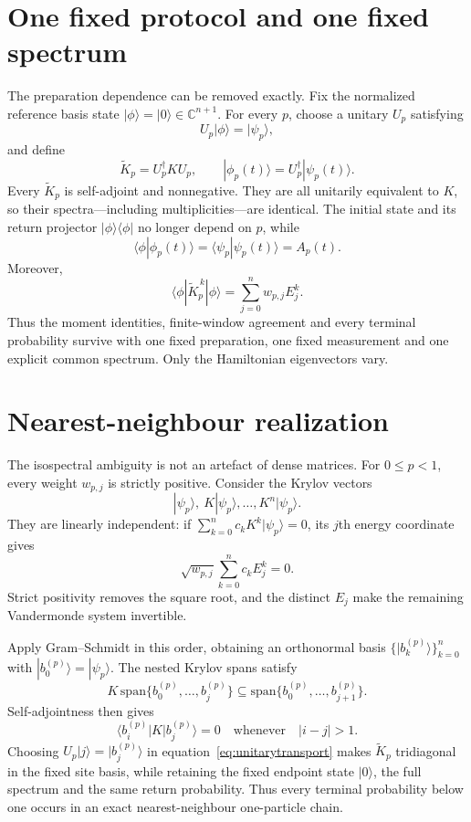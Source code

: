 \documentclass[12pt]{article}
\newcommand{\C}{\mathbb C}
\begin{document}
\section*{One fixed protocol and one fixed spectrum}

The preparation dependence can be removed exactly. Fix the normalized
reference basis state \(|\phi\rangle=|0\rangle\in\C^{n+1}\). For every \(p\), choose a
unitary \(U_p\) satisfying
\[
 U_p|\phi\rangle=|\psi_p\rangle,
\]
and define
\begin{equation}
 \widetilde K_p=U_p^\dagger K U_p,\qquad
 |\phi_p(t)\rangle=U_p^\dagger|\psi_p(t)\rangle .
\label{eq:unitarytransport}
\end{equation}
Every \(\widetilde K_p\) is self-adjoint and nonnegative. They are all
unitarily equivalent to \(K\), so their spectra---including
multiplicities---are identical. The initial state and its return projector
\(|\phi\rangle\langle\phi|\) no longer depend on \(p\), while
\begin{equation}
 \langle\phi|\phi_p(t)\rangle
 =\langle\psi_p|\psi_p(t)\rangle=A_p(t).
\label{eq:fixedprotocol}
\end{equation}
Moreover,
\[
 \langle\phi|\widetilde K_p^{\,k}|\phi\rangle
 =\sum_{j=0}^{n}w_{p,j}E_j^k.
\]
Thus the moment identities, finite-window agreement and every terminal
probability survive with one fixed preparation, one fixed measurement and
one explicit common spectrum. Only the Hamiltonian eigenvectors vary.

\section*{Nearest-neighbour realization}

The isospectral ambiguity is not an artefact of dense matrices. For
\(0\leq p<1\), every weight \(w_{p,j}\) is strictly positive. Consider the
Krylov vectors
\[
 |\psi_p\rangle,\ K|\psi_p\rangle,\ldots,K^n|\psi_p\rangle.
\]
They are linearly independent: if
\(\sum_{k=0}^{n}c_kK^k|\psi_p\rangle=0\), its \(j\)th energy coordinate
gives
\[
 \sqrt{w_{p,j}}\sum_{k=0}^{n}c_kE_j^k=0.
\]
Strict positivity removes the square root, and the distinct \(E_j\) make
the remaining Vandermonde system invertible.

Apply Gram--Schmidt in this order, obtaining an orthonormal basis
\(\{|b_k^{(p)}\rangle\}_{k=0}^{n}\) with
\(|b_0^{(p)}\rangle=|\psi_p\rangle\). The nested Krylov spans satisfy
\[
 K\,\mathrm{span}\{b_0^{(p)},\ldots,b_j^{(p)}\}
 \subseteq
 \mathrm{span}\{b_0^{(p)},\ldots,b_{j+1}^{(p)}\}.
\]
Self-adjointness then gives
\begin{equation}
 \langle b_i^{(p)}|K|b_j^{(p)}\rangle=0
 \quad\text{whenever}\quad |i-j|>1.
\label{eq:tridiagonal}
\end{equation}
Choosing \(U_p|j\rangle=|b_j^{(p)}\rangle\) in
equation~\eqref{eq:unitarytransport} makes \(\widetilde K_p\)
tridiagonal in the fixed site basis, while retaining the fixed endpoint
state \(|0\rangle\), the full spectrum and the same return probability.
Thus every terminal probability below one occurs in an exact
nearest-neighbour one-particle chain.
\end{document}
